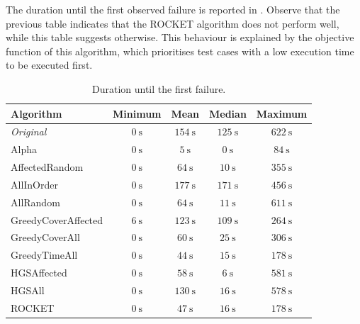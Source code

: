 \noindent The duration until the first observed failure is reported in . Observe that the previous table indicates that the ROCKET algorithm does not perform well, while this table suggests otherwise. This behaviour is explained by the objective function of this algorithm, which prioritises test cases with a low execution time to be executed first.

\begin{table}[htbp!]
	\centering
	\begin{tabularx}{\textwidth}{|X||c|c|c|c|}
		\hline
		\textbf{Algorithm} & \textbf{Minimum} & \textbf{Mean} & \textbf{Median} & \textbf{Maximum}\\
		
		\hline
		
		\emph{Original} & $\SI{0}{\second}$ & $\SI{154}{\second}$ & $\SI{125}{\second}$ & $\SI{622}{\second}$\\
		
		\hline
		
		Alpha & $\SI{0}{\second}$ & $\SI{5}{\second}$ & $\SI{0}{\second}$ & $\SI{84}{\second}$\\
		
		\hline
		AffectedRandom & $\SI{0}{\second}$ & $\SI{64}{\second}$ & $\SI{10}{\second}$ & $\SI{355}{\second}$\\
		AllInOrder & $\SI{0}{\second}$ & $\SI{177}{\second}$ & $\SI{171}{\second}$ & $\SI{456}{\second}$\\
		AllRandom & $\SI{0}{\second}$ & $\SI{64}{\second}$ & $\SI{11}{\second}$ & $\SI{611}{\second}$\\
		
		\hline
		
		GreedyCoverAffected & $\SI{6}{\second}$ & $\SI{123}{\second}$ & $\SI{109}{\second}$ & $\SI{264}{\second}$\\
		GreedyCoverAll & $\SI{0}{\second}$ & $\SI{60}{\second}$ & $\SI{25}{\second}$ & $\SI{306}{\second}$\\
		GreedyTimeAll & $\SI{0}{\second}$ & $\SI{44}{\second}$ & $\SI{15}{\second}$ & $\SI{178}{\second}$\\
		
		\hline
		
		HGSAffected & $\SI{0}{\second}$ & $\SI{58}{\second}$ & $\SI{6}{\second}$ & $\SI{581}{\second}$\\
		HGSAll & $\SI{0}{\second}$ & $\SI{130}{\second}$ & $\SI{16}{\second}$ & $\SI{578}{\second}$\\
		
		\hline
		
		ROCKET & $\SI{0}{\second}$ & $\SI{47}{\second}$ & $\SI{16}{\second}$ & $\SI{178}{\second}$\\
		
		\hline
	\end{tabularx}
	\caption{Duration until the first failure.}
	\label{tbl:rq4-first-failure-duration}
\end{table}

